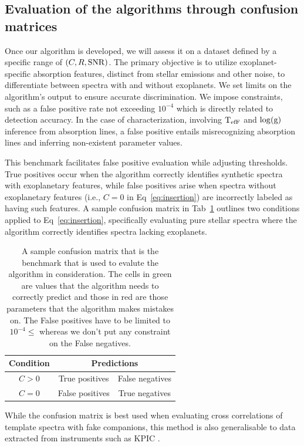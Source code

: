 \subsection{ Evaluation of the algorithms through confusion matrices}
Once our algorithm is developed, we will assess it on a dataset defined by a specific range of $\left (C, R, \rm{SNR}\right)$. The primary objective is to utilize exoplanet-specific absorption features, distinct from stellar emissions and other noise, to differentiate between spectra with and without exoplanets. 
We set limits on the algorithm's output to ensure accurate discrimination. We impose constraints, such as a false positive rate not exceeding $10^{-4}$ which is directly related to detection accuracy. In the case of characterization, involving $\rm{T_{efF}}$ and $\rm{\log(g)}$ inference from absorption lines, a false positive entails misrecognizing absorption lines and inferring non-existent parameter values.

This benchmark facilitates false positive evaluation while adjusting thresholds. 
True positives occur when the algorithm correctly identifies synthetic spectra with exoplanetary features, while false positives arise when spectra without exoplanetary features (i.e., $C=0$ in Eq~\ref{eq:insertion}) are incorrectly labeled as having such features. 
A sample confusion matrix in Tab~\ref{tab:sample_cm} outlines two conditions applied to Eq~\ref{eq:insertion}, specifically evaluating pure stellar spectra where the algorithm correctly identifies spectra lacking exoplanets. 
\begin{table}[ht!]
    \centering
    \begin{tabular}{|c|c|c|}
    \hline
    Condition&  \multicolumn{2}{|c|}{ Predictions}\\
    \hline
        $C>0$ &\cellcolor{green!50}  True positives& \cellcolor{red!50}False negatives\\
        \hline
        $C=0$ &  \cellcolor{red!50}False positives& \cellcolor{green!50}True negatives\\
        \hline
    \end{tabular}
    \caption{A sample confusion matrix that is the benchmark that is used to evalute the algorithm in consideration. 
    The cells in green are values that the algorithm needs to correctly predict and those in red are those parameters that the algorithm makes mistakes on.
    The False positives have to be limited to $10^{-4}\le$ whereas we don't put any constraint on the False negatives.}
    \label{tab:sample_cm}
\end{table}
While the confusion matrix is best used when evaluating cross correlations of template spectra with fake companions, this method is also generalisable to data extracted from instruments such as KPIC \citep[][]{2019KPIC}.
